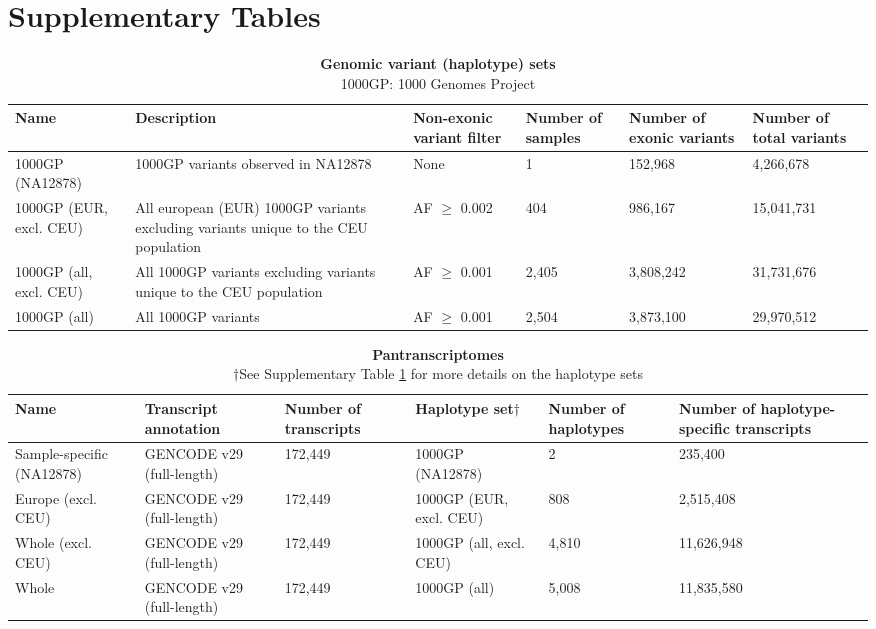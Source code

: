 \documentclass[11pt]{ucthesis}
\begin{document}
\section{Supplementary Tables}

\begin{table}[H]
\ssp
\footnotesize
\begin{tabular}{L{0.13\textwidth}| L{0.25\textwidth} | R{0.12\textwidth} | R{0.1\textwidth} | R{0.11\textwidth} | R{0.11\textwidth}}
\textbf{Name} & \textbf{Description} & \textbf{Non-exonic variant filter} & \textbf{Number of samples} & \textbf{Number of exonic variants} & \textbf{Number of total variants} \\
\midrule
1000GP (NA12878)& 1000GP variants observed in NA12878 & None & 1 & 152,968 & 4,266,678 \\
\midrule
1000GP (EUR, excl. CEU) & All european (EUR) 1000GP variants excluding variants unique to the CEU population & AF $\geq$ 0.002 & 404 & 986,167 & 15,041,731 \\
\midrule
1000GP (all, excl. CEU) & All 1000GP variants excluding variants unique to the CEU population & AF $\geq$ 0.001 & 2,405 & 3,808,242 & 31,731,676 \\
\midrule
1000GP (all) & All 1000GP variants & AF $\geq$ 0.001 & 2,504 & 3,873,100 & 29,970,512
\end{tabular}
\caption{\textbf{Genomic variant (haplotype) sets} \\
1000GP: 1000 Genomes Project}
\label{tab:haplotype-sets}
\end{table}

\begin{table}[H]
\ssp
\footnotesize
\begin{tabular}{L{0.13\textwidth} | L{0.14\textwidth} | R{0.12\textwidth} | L{0.13\textwidth} | R{0.11\textwidth} | R{0.17\textwidth}}
\textbf{Name} & \textbf{Transcript annotation} & \textbf{Number of transcripts} & \textbf{Haplotype set}$\dag$ & \textbf{Number of haplotypes} & \textbf{Number of haplotype-specific transcripts} \\
\midrule
Sample-specific (NA12878)& GENCODE v29 (full-length) & 172,449 & 1000GP (NA12878) & 2 & 235,400 \\
\midrule
Europe (excl. CEU) & GENCODE v29 (full-length) & 172,449 & 1000GP (EUR, excl. CEU) & 808 & 2,515,408 \\
\midrule
Whole (excl. CEU) & GENCODE v29 (full-length) & 172,449 & 1000GP (all, excl. CEU) & 4,810 & 11,626,948 \\
\midrule
Whole & GENCODE v29 (full-length) & 172,449 & 1000GP (all) & 5,008 & 11,835,580
\end{tabular}
\caption{\textbf{Pantranscriptomes}\\
$\dag$See Supplementary Table \ref{tab:haplotype-sets} for more details on the haplotype sets
}
\label{tab:pantranscriptomes}
\end{table}
\end{document}
